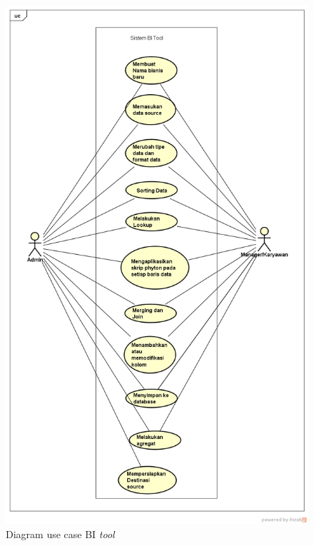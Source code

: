 \begin{figure}[h]
	\centering
	\includegraphics[scale=0.4]{Gambar/usecase-bi}
	\caption{Diagram use case BI \textit{tool}}
	\end{figure}

